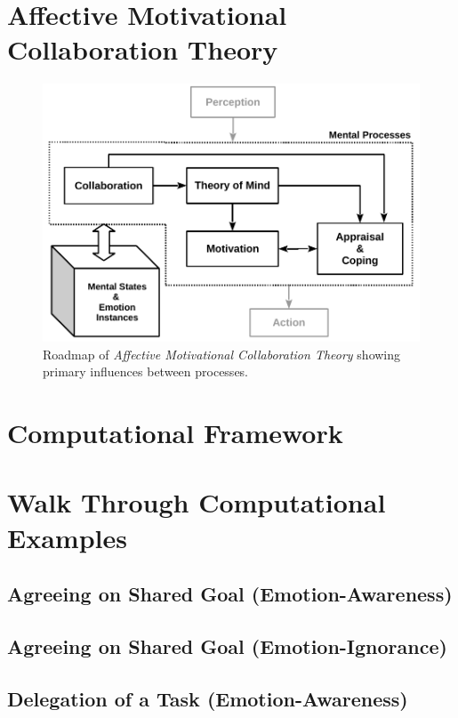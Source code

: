 \section{Affective Motivational Collaboration Theory}
\label{sec:AMCT}

\begin{figure}[h!]
  \includegraphics[scale=0.78]{figure/theory-general-croped.pdf}
  \caption{Roadmap of \textit{Affective Motivational Collaboration Theory}
  showing primary influences between processes.}
  \label{fig:theory}
\end{figure}

\section{Computational Framework}

\section{Walk Through Computational Examples}

\subsection{Agreeing on Shared Goal (Emotion-Awareness)}
\label{sec:wt-exp1}

\subsection{Agreeing on Shared Goal (Emotion-Ignorance)}
\label{sec:wt-exp2}

\subsection{Delegation of a Task (Emotion-Awareness)}
\label{sec:wt-exp3}

